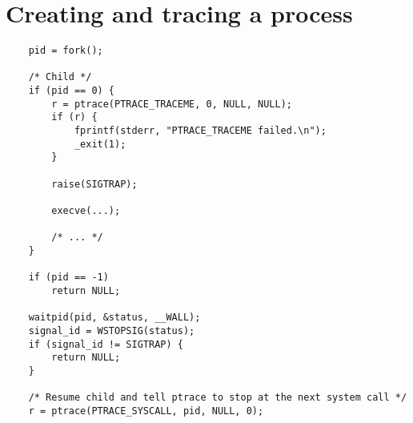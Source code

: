 \documentclass[a4paper, 10pt]{report}
\begin{document}
\appendix
\addappheadtotoc

\chapter{Creating and tracing a process}
\label{appendix:createtrace}

\begin{lstlisting}
    pid = fork();

    /* Child */
    if (pid == 0) {
        r = ptrace(PTRACE_TRACEME, 0, NULL, NULL);
        if (r) {
            fprintf(stderr, "PTRACE_TRACEME failed.\n");
            _exit(1);
        }

        raise(SIGTRAP);

        execve(...);

        /* ... */
    }

    if (pid == -1)
        return NULL;

    waitpid(pid, &status, __WALL);
    signal_id = WSTOPSIG(status);
    if (signal_id != SIGTRAP) {
        return NULL;
    }

    /* Resume child and tell ptrace to stop at the next system call */
    r = ptrace(PTRACE_SYSCALL, pid, NULL, 0);
\end{lstlisting}
\end{document}

